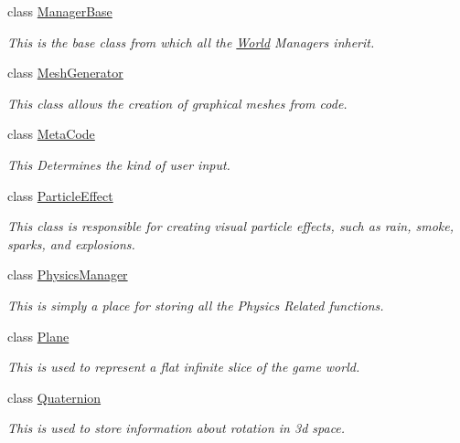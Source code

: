 \begin{DoxyCompactItemize}
class \hyperlink{classphys_1_1ManagerBase}{ManagerBase}
\begin{DoxyCompactList}\small\item\em This is the base class from which all the \hyperlink{classphys_1_1World}{World} Managers inherit. \item\end{DoxyCompactList}\item 
class \hyperlink{classphys_1_1MeshGenerator}{MeshGenerator}
\begin{DoxyCompactList}\small\item\em This class allows the creation of graphical meshes from code. \item\end{DoxyCompactList}\item 
class \hyperlink{classphys_1_1MetaCode}{MetaCode}
\begin{DoxyCompactList}\small\item\em This Determines the kind of user input. \item\end{DoxyCompactList}\item 
class \hyperlink{classphys_1_1ParticleEffect}{ParticleEffect}
\begin{DoxyCompactList}\small\item\em This class is responsible for creating visual particle effects, such as rain, smoke, sparks, and explosions. \item\end{DoxyCompactList}\item 
class \hyperlink{classphys_1_1PhysicsManager}{PhysicsManager}
\begin{DoxyCompactList}\small\item\em This is simply a place for storing all the Physics Related functions. \item\end{DoxyCompactList}\item 
class \hyperlink{classphys_1_1Plane}{Plane}
\begin{DoxyCompactList}\small\item\em This is used to represent a flat infinite slice of the game world. \item\end{DoxyCompactList}\item 
class \hyperlink{classphys_1_1Quaternion}{Quaternion}
\begin{DoxyCompactList}\small\item\em This is used to store information about rotation in 3d space. \item\end{DoxyCompactList}\item 

\end{DoxyCompactItemize}
